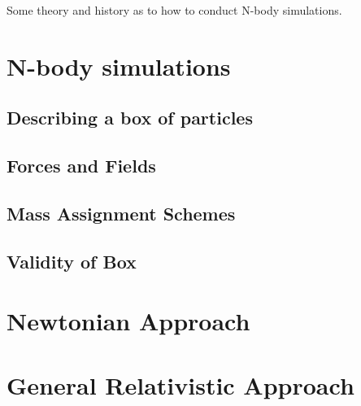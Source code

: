 %
%
Some theory and history as to how to conduct N-body simulations. 
\section{N-body simulations}

\subsection{Describing a box of particles}

\subsection{Forces and Fields}

\subsection{Mass Assignment Schemes}

\subsection{Validity of Box}


\section{Newtonian Approach}


\section{General Relativistic Approach}